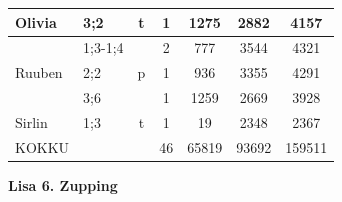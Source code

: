 \documentclass[12pt]{article}
\begin{document}
\begin{table}[H]
{\begin{tabular}{|l|l|c|c|c|c|c|}
Olivia                   & 3;2        & t                         & 1                               & 1275                             & 2882                              & 4157                       \\ \hline
\multirow{3}{*}{Ruuben}  & 1;3-1;4    & \multirow{3}{*}{p}        & 2                               & 777                              & 3544                              & 4321                       \\ \cline{2-2} \cline{4-7} 
                         & 2;2        &                           & 1                               & 936                              & 3355                              & 4291                       \\ \cline{2-2} \cline{4-7} 
                         & 3;6        &                           & 1                               & 1259                             & 2669                              & 3928                       \\ \hline
Sirlin                   & 1;3        & t                         & 1                               & 19                               & 2348                              & 2367                       \\ \hline\hline
KOKKU                    & \multicolumn{2}{l|}{}                  & 46                              & 65819                            & 93692                             & 159511                     \\ \hline
\end{tabular}}
\end{table}
\hfill




\textbf{Lisa 6. Zupping}
\end{document}
